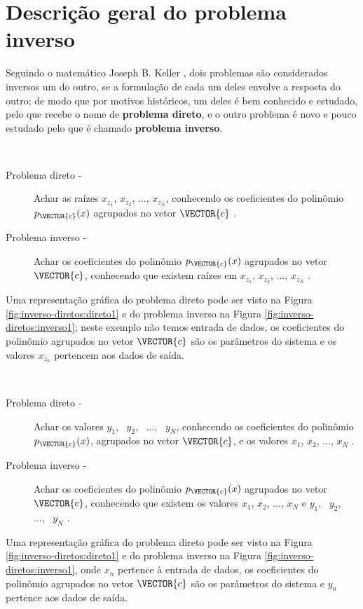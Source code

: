 
\section{Descrição geral do problema inverso}

Seguindo o matemático Joseph B. Keller \cite{Keller76}, dois problemas são considerados inversos 
um do outro, se a formulação de cada um deles envolve a resposta do outro;
de modo que por motivos históricos, um deles é bem conhecido e estudado,
pelo que recebe o nome de \textbf{problema direto}, 
e o outro problema é novo e pouco estudado pelo que é chamado \textbf{problema inverso}.
 
\begin{example}~
\begin{description}
\item[Problema direto -] Achar as raízes $x_{z_1}$, $x_{z_2}$, ..., $x_{z_N}$, 
conhecendo os coeficientes do polinômio $p_{\VECTOR{c}}(x)$ agrupados no vetor $\VECTOR{c}$  \cite{Keller76}.
\item[Problema inverso -] Achar os coeficientes do polinômio $p_{\VECTOR{c}}(x)$ agrupados no vetor $\VECTOR{c}$, 
conhecendo que existem raízes em $x_{z_1}$, $x_{z_2}$, ..., $x_{z_N}$ \cite{Keller76}.
\end{description}
Uma representação gráfica do problema direto pode ser visto na Figura \ref{fig:inverso-diretos:direto1}
e do problema inverso na Figura \ref{fig:inverso-diretos:inverso1};
neste exemplo não temos entrada de dados, 
os coeficientes do polinômio agrupados no vetor $\VECTOR{c}$ são os parâmetros do sistema e 
os valores $x_{z_n}$ pertencem aos dados de saída.
\end{example}

\begin{example}~
\begin{description}
\item[Problema direto -] Achar os valores $y_1$,~ $y_2$,~ ...,~ $y_N$, 
conhecendo os coeficientes do polinômio $p_{\VECTOR{c}}(x)$, agrupados no vetor $\VECTOR{c}$, e
os valores $x_1$, $x_2$, ..., $x_N$ \cite{Keller76}.
\item[Problema inverso -] Achar os coeficientes do polinômio $p_{\VECTOR{c}}(x)$ agrupados no vetor $\VECTOR{c}$, 
conhecendo que existem os valores $x_1$, $x_2$, ..., $x_N$ e 
$y_1$,~ $y_2$,~ ...,~ $y_N$  \cite{Keller76}.
\end{description}
Uma representação gráfica do problema direto pode ser visto na Figura \ref{fig:inverso-diretos:direto1}
e do problema inverso na Figura \ref{fig:inverso-diretos:inverso1}, 
onde $x_n$ pertence à entrada de dados, 
os coeficientes do polinômio agrupados no vetor $\VECTOR{c}$ são os parâmetros do sistema e $y_n$ pertence aos dados de saída.
\end{example}


